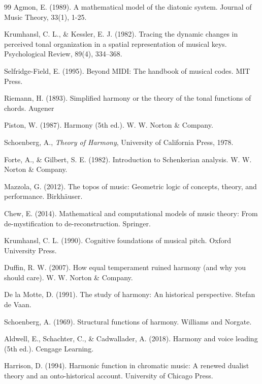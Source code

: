 \documentclass[12pt]{report}
\begin{document}
\begin{thebibliography}{99}
Agmon, E. (1989). A mathematical model of the diatonic system. Journal of Music Theory, 33(1), 1-25.

 Krumhansl, C. L., \& Kessler, E. J. (1982). Tracing the dynamic changes in perceived tonal organization in a spatial representation of musical keys. Psychological Review, 89(4), 334–368.

 Selfridge-Field, E. (1995). Beyond MIDI: The handbook of musical codes. MIT Press.

 Riemann, H. (1893). Simplified harmony or the theory of the tonal functions of chords. Augener

 Piston, W. (1987). Harmony (5th ed.). W. W. Norton \& Company.


 Schoenberg, A., \textit{Theory of Harmony}, University of California Press, 1978.

 Forte, A., \& Gilbert, S. E. (1982). Introduction to Schenkerian analysis. W. W. Norton \& Company.

 Mazzola, G. (2012). The topos of music: Geometric logic of concepts, theory, and performance. Birkhäuser.

 Chew, E. (2014). Mathematical and computational models of music theory: From de-mystification to de-reconstruction. Springer.

 Krumhansl, C. L. (1990). Cognitive foundations of musical pitch. Oxford University Press.

 Duffin, R. W. (2007). How equal temperament ruined harmony (and why you should care). W. W. Norton \& Company.

 De la Motte, D. (1991). The study of harmony: An historical perspective. Stefan de Vaan.

 Schoenberg, A. (1969). Structural functions of harmony. Williams and Norgate.

 Aldwell, E., Schachter, C., \& Cadwallader, A. (2018). Harmony and voice leading (5th ed.). Cengage Learning.

 Harrison, D. (1994). Harmonic function in chromatic music: A renewed dualist theory and an onto-historical account. University of Chicago Press.


\end{thebibliography}
\end{document}
